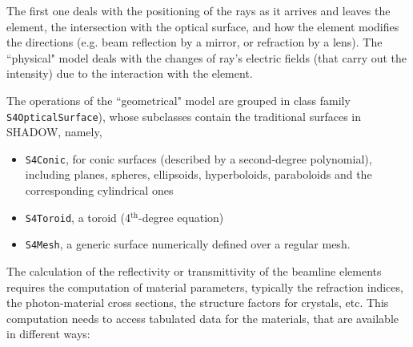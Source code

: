 The first one deals with the positioning of the rays as it arrives and leaves the element, the intersection with the optical surface, and how the element modifies the directions (e.g. beam reflection by a mirror, or refraction by a lens). The ``physical" model deals with the changes of ray's electric fields (that carry out the intensity) due to the interaction with the element. 

The operations of the ``geometrical" model are grouped in class family {\tt S4OpticalSurface}), whose subclasses contain the traditional surfaces in SHADOW, namely,
\begin{itemize}
    \item {\tt S4Conic}, for conic surfaces (described by a second-degree polynomial), including planes, spheres, ellipsoids, hyperboloids, paraboloids and the corresponding cylindrical ones \cite{S4Conic}
    \item {\tt S4Toroid}, a toroid (4$^\text{th}$-degree equation)
    \item {\tt S4Mesh}, a generic surface numerically defined over a regular mesh. 
\end{itemize}

The calculation of the reflectivity or transmittivity of the beamline elements requires the computation of material parameters, typically the refraction indices, the photon-material cross sections, the structure factors for crystals, etc. This computation needs to access tabulated data for the materials, that are available in different ways:

